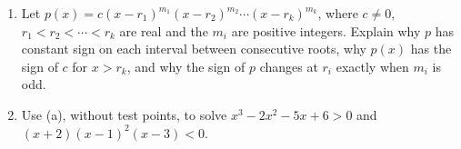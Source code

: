 \begin{enumerate}
\item[(a)] Let $p(x)=c(x-r_1)^{m_1}(x-r_2)^{m_2}\cdots(x-r_k)^{m_k}$, where $c\ne0$, $r_1<r_2<\cdots<r_k$ are real and the $m_i$ are positive integers. Explain why $p$ has constant sign on each interval between consecutive roots, why $p(x)$ has the sign of $c$ for $x>r_k$, and why the sign of $p$ changes at $r_i$ exactly when $m_i$ is odd.
\item[(b)] Use (a), without test points, to solve $x^3-2x^2-5x+6>0$ and $(x+2)(x-1)^2(x-3)<0$.
\end{enumerate}
